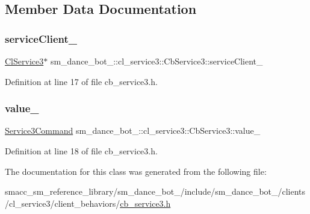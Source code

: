 \subsection{Member Data Documentation}
\mbox{\label{classsm__dance__bot__2_1_1cl__service3_1_1CbService3_ac5fafa2528bba4c7411816dde044c48a}} 
\subsubsection{\texorpdfstring{service\+Client\+\_\+}{serviceClient\_}}
{\footnotesize\ttfamily \hyperlink{classsm__dance__bot__2_1_1cl__service3_1_1ClService3}{Cl\+Service3}$\ast$ sm\+\_\+dance\+\_\+bot\+\_\+::cl\+\_\+service3\+::\+Cb\+Service3\+::service\+Client\+\_\+\hspace{0.3cm}{\ttfamily [private]}}



Definition at line 17 of file cb\+\_\+service3.\+h.

\mbox{\label{classsm__dance__bot__2_1_1cl__service3_1_1CbService3_ae48a64bc675b548fcb9c059831e39e37}} 
\subsubsection{\texorpdfstring{value\+\_\+}{value\_}}
{\footnotesize\ttfamily \hyperlink{namespacesm__dance__bot__2_1_1cl__service3_adfc3ce70a327b24b4fb6d6b02803caff}{Service3\+Command} sm\+\_\+dance\+\_\+bot\+\_\+::cl\+\_\+service3\+::\+Cb\+Service3\+::value\+\_\+\hspace{0.3cm}{\ttfamily [private]}}



Definition at line 18 of file cb\+\_\+service3.\+h.



The documentation for this class was generated from the following file\+:\begin{DoxyCompactItemize}
\item 
smacc\+\_\+sm\+\_\+reference\+\_\+library/sm\+\_\+dance\+\_\+bot\+\_/include/sm\+\_\+dance\+\_\+bot\+\_/clients/cl\+\_\+service3/client\+\_\+behaviors/\hyperlink{2_2include_2sm__dance__bot__2_2clients_2cl__service3_2client__behaviors_2cb__service3_8h}{cb\+\_\+service3.\+h}\end{DoxyCompactItemize}
